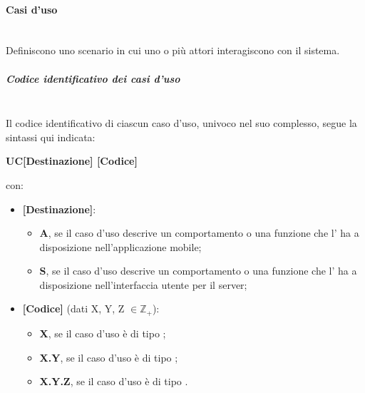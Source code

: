 \paragraph{Casi d'uso}\mbox{}\\
Definiscono uno scenario in cui uno o più attori interagiscono con il sistema.
\subparagraph*{Codice identificativo dei casi d'uso}\mbox{}\\
Il codice identificativo di ciascun caso d’uso, univoco nel suo complesso, segue la sintassi qui indicata:
\begin{center}
	\textbf{UC[Destinazione] [Codice]}
\end{center}
con:
\begin{itemize}
	\item \textbf{[Destinazione]}:
		\begin{itemize}
			\item \textbf{A}, se il caso d’uso descrive un comportamento o una funzione che l’ ha a disposizione nell'applicazione mobile;
			\item \textbf{S}, se il caso d’uso descrive un comportamento o una funzione che l' ha a disposizione nell'interfaccia utente per il server;
		\end{itemize}
	\item \textbf{[Codice]} (dati X, Y, Z $\in \mathbb{Z_+}$):
	\begin{itemize}
		\item \textbf{X}, se il caso d'uso è di tipo ;
		\item \textbf{X.Y}, se il caso d'uso è di tipo ;
		\item \textbf{X.Y.Z}, se il caso d'uso è di tipo .
	\end{itemize}
\end{itemize}

